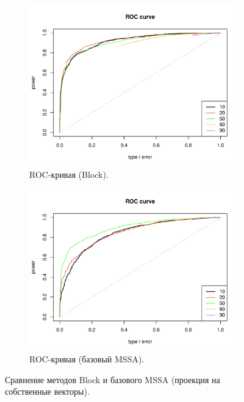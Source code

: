 \documentclass[specialist,
substylefile = spbu_report.rtx,
subf,href,colorlinks=true, 12pt]{disser}
\theoremstyle{definition}
\begin{document}
\begin{figure}
\begin{subfigure}[t]{0.45\textwidth}
			\centering
			\includegraphics[width=\textwidth]{roc_block_ev.pdf}
			\caption{ROC-кривая (Block).}
		\end{subfigure}\hspace{\fill}
		\begin{subfigure}[t]{0.45\textwidth}
			\centering
			\includegraphics[width=\textwidth]{roc_mssa_ev.pdf}
			\caption{ROC-кривая (базовый MSSA).}
		\end{subfigure}
		\caption{Сравнение методов Block и базового MSSA (проекция на собственные векторы).}
		\label{fig:block_ev}
	\end{figure}
\end{document}
